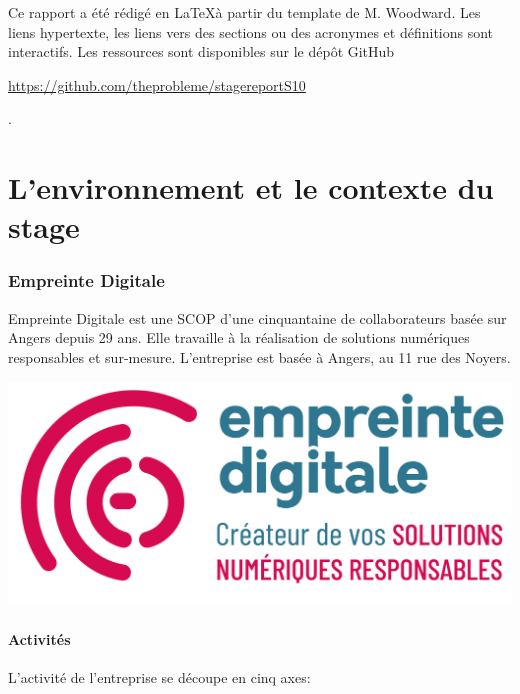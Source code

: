 \documentclass[12pt, a4paper, twoside]{article}
\begin{document}
Ce rapport a été rédigé en \LaTeX à partir du template de M. Woodward. 
Les liens hypertexte, les liens vers des sections ou des acronymes et définitions sont interactifs.
Les ressources sont disponibles sur le dépôt GitHub \begin{hilite}\url{https://github.com/theprobleme/stagereportS10}\end{hilite}.

\newpage
\part{L'environnement et le contexte du stage}
\section{Empreinte Digitale}
\noindent%
\begin{minipage}{.7\textwidth}%
Empreinte Digitale est une \gls{SCOP} d'une cinquantaine de collaborateurs basée sur Angers depuis 29 ans. 
Elle travaille à la réalisation de solutions numériques responsables et sur-mesure.
L'entreprise est basée à Angers, au 11 rue des Noyers.
\end{minipage}%
\hfill
\begin{minipage}{.3\textwidth}%
\begin{center}
    \includegraphics[scale=0.35]{src/logo_ed.png}
\end{center}
\end{minipage}%

\subsection{Activités}
\noindent%
L'activité de l'entreprise se découpe en cinq axes:
\end{document}
